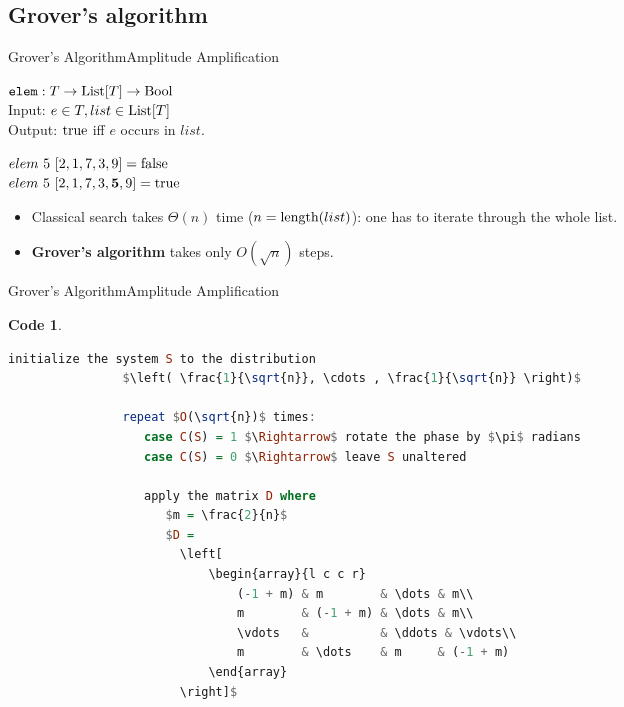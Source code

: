 \documentclass{beamer}
\newcommand{\mt}[1]{\textnormal{#1}}
\newtheorem{code}[theorem]{Code}
\begin{document}
\subsection{Grover's algorithm}

\begin{frame}{Grover's Algorithm}{Amplitude Amplification}
	\begin{definition}
		$\texttt{elem} : T \rightarrow \mt{List}[T] \rightarrow \mt{Bool}$\\
        	Input: $e \in T, list \in \mt{List}[T]$\\
        	Output: $\mt{true}$ iff $e$ occurs in $list$. 
	\end{definition}
    
    \begin{example}
       $elem\ 5\ [2,1,7,3,9] = \mt{false}$\\
       $elem\ 5\ [2,1,7,3,\textbf{5},9] = \mt{true}$
    \end{example}

	\begin{itemize}
		\item Classical search takes $\Theta(n)$ time ($n = \mt{length}(list)$): one has to iterate through the whole list.

		\item \textbf{Grover's algorithm} takes only $O(\sqrt{n})$ steps.
	\end{itemize}
\end{frame}

\begin{frame}[fragile]{Grover's Algorithm}{Amplitude Amplification}       
    \begin{code}
    	\begin{flushleft}
        	\vspace{-0.5cm}
			\begin{lstlisting}[mathescape, language=Haskell]
				initialize the system S to the distribution
				$\left( \frac{1}{\sqrt{n}}, \cdots , \frac{1}{\sqrt{n}} \right)$
                   
				repeat $O(\sqrt{n})$ times:
				   case C(S) = 1 $\Rightarrow$ rotate the phase by $\pi$ radians
				   case C(S) = 0 $\Rightarrow$ leave S unaltered
                   
				   apply the matrix D where
				      $m = \frac{2}{n}$
				      $D =
                      	\left[
                        	\begin{array}{l c c r}
                            	(-1 + m) & m        & \dots & m\\
                                m        & (-1 + m) & \dots & m\\
                                \vdots   &          & \ddots & \vdots\\
                                m        & \dots    & m     & (-1 + m)
                            \end{array}
                        \right]$
			\end{lstlisting}
		\end{flushleft}
    \end{code}
\end{frame}
\end{document}
